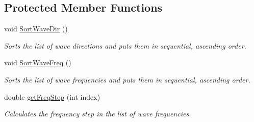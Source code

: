\subsection*{Protected Member Functions}
\begin{DoxyCompactItemize}
\item 
void \hyperlink{classosea_1_1_sea_model_a55e5cded1bc85a5392e0b7a3e9dd4062}{Sort\-Wave\-Dir} ()
\begin{DoxyCompactList}\small\item\em Sorts the list of wave directions and puts them in sequential, ascending order. \end{DoxyCompactList}\item 
void \hyperlink{classosea_1_1_sea_model_a08c6a13c0ce58f5b404829f699f8f30e}{Sort\-Wave\-Freq} ()
\begin{DoxyCompactList}\small\item\em Sorts the list of wave frequencies and puts them in sequential, ascending order. \end{DoxyCompactList}\item 
double \hyperlink{classosea_1_1_sea_model_a5a45cf7c70d0cca9454eab69acee2d25}{get\-Freq\-Step} (int index)
\begin{DoxyCompactList}\small\item\em Calculates the frequency step in the list of wave frequencies. \end{DoxyCompactList}\end{DoxyCompactItemize}
